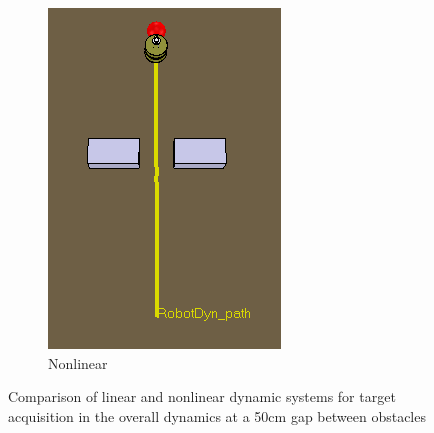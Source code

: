 \begin{figure}[htb!]
\begin{subfigure}{.45\textwidth}
    \includegraphics[width=\textwidth]{img/nonlinear.PNG}%
  \caption{Nonlinear}%
  \label{fig:obs-tar-linear-50-2}%
  \end{subfigure}
    \caption[Comparison of linear and nonlinear dynamic systems for target
    acquisition in the overall dynamics]{Comparison of linear and nonlinear dynamic systems for target
      acquisition in the overall dynamics at a 50cm gap between obstacles}%
    \label{fig:obs-tar-linear-50}%
\end{figure}

